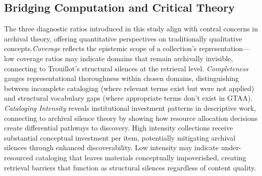 \documentclass[final]{anthology-ch}
\begin{document}
\subsection{Bridging Computation and Critical Theory}
The three diagnostic ratios introduced in this study align with central concerns in archival theory, offering quantitative perspectives on traditionally qualitative concepts.\textit{Coverage} reflects the epistemic scope of a collection's representation---low coverage ratios may indicate domains that remain archivally invisible, connecting to Trouillot's structural silences at the retrieval level. \textit{Completeness} gauges representational thoroughness within chosen domains, distinguishing between incomplete cataloging (where relevant terms exist but were not applied) and structural vocabulary gaps (where appropriate terms don't exist in GTAA). \textit{Cataloging Intensity} reveals institutional investment patterns in descriptive work, connecting to archival silence theory by showing how resource allocation decisions create differential pathways to discovery. High intensity collections receive substantial conceptual investment per item, potentially mitigating archival silences through enhanced discoverability. Low intensity may indicate under-resourced cataloging that leaves materials conceptually impoverished, creating retrieval barriers that function as structural silences regardless of content quality.
\end{document}

